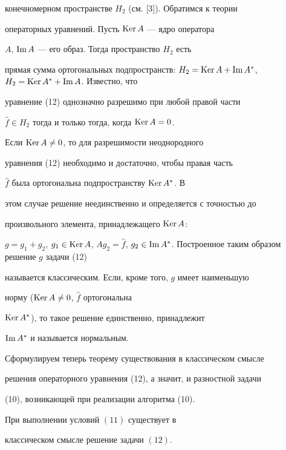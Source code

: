 конечномерном пространстве $H_2$ (см. [3]). Обратимся к теории


операторных уравнений. Пусть $\operatorname{Ker} A$ --- ядро оператора


$A$, $\operatorname{Im} A$ --- его образ. Тогда пространство $H_2$ есть


прямая сумма ортогональных подпространств: $H_2=\Ker A+


\im A^*$, $H_2=\Ker A^*+\im A$. Известно, что


уравнение (12) однозначно разрешимо при любой правой части


$\widehat f\in H_2$ тогда и только тогда, когда $\operatorname{Ker} A=0$.


Если $\operatorname{Ker} A\ne 0$, то для разрешимости неоднородного


уравнения (12) необходимо и достаточно, чтобы правая часть


$\widehat f$ была ортогональна подпространству $\operatorname{Ker} A^*$. В


этом случае решение неединственно и определяется с точностью до


произвольного элемента, принадлежащего $\operatorname{Ker} A$:


$g=g_1+g_2$, $g_1\in\Ker A$, $Ag_2=\widehat f$, $g_2\in


\im A^*$. Построенное таким образом решение $g$ задачи (12)


называется классическим. Если, кроме того, $g$ имеет наименьшую


норму ($\operatorname{Ker} A\ne 0$, $\widehat f$ ортогональна


$\operatorname{Ker} A^*$), то такое решение единственно, принадлежит


$\operatorname{Im} A^*$ и называется нормальным.





Сформулируем теперь теорему существования в классическом смысле


решения операторного уравнения (12), а значит, и разностной задачи


(10), возникающей при реализации алгоритма (10).





\begin{thm}


При выполнении условий $(11)$ существует в


классическом смысле решение задачи $(12)$.


\end{thm}





